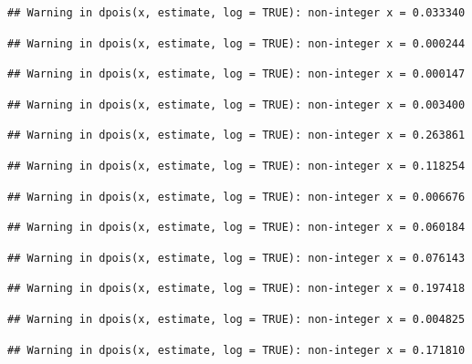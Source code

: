 \documentclass[]{article}
\begin{document}
\begin{verbatim}
## Warning in dpois(x, estimate, log = TRUE): non-integer x = 0.033340
\end{verbatim}

\begin{verbatim}
## Warning in dpois(x, estimate, log = TRUE): non-integer x = 0.000244
\end{verbatim}

\begin{verbatim}
## Warning in dpois(x, estimate, log = TRUE): non-integer x = 0.000147
\end{verbatim}

\begin{verbatim}
## Warning in dpois(x, estimate, log = TRUE): non-integer x = 0.003400
\end{verbatim}

\begin{verbatim}
## Warning in dpois(x, estimate, log = TRUE): non-integer x = 0.263861
\end{verbatim}

\begin{verbatim}
## Warning in dpois(x, estimate, log = TRUE): non-integer x = 0.118254
\end{verbatim}

\begin{verbatim}
## Warning in dpois(x, estimate, log = TRUE): non-integer x = 0.006676
\end{verbatim}

\begin{verbatim}
## Warning in dpois(x, estimate, log = TRUE): non-integer x = 0.060184
\end{verbatim}

\begin{verbatim}
## Warning in dpois(x, estimate, log = TRUE): non-integer x = 0.076143
\end{verbatim}

\begin{verbatim}
## Warning in dpois(x, estimate, log = TRUE): non-integer x = 0.197418
\end{verbatim}

\begin{verbatim}
## Warning in dpois(x, estimate, log = TRUE): non-integer x = 0.004825
\end{verbatim}

\begin{verbatim}
## Warning in dpois(x, estimate, log = TRUE): non-integer x = 0.171810
\end{verbatim}
\end{document}
